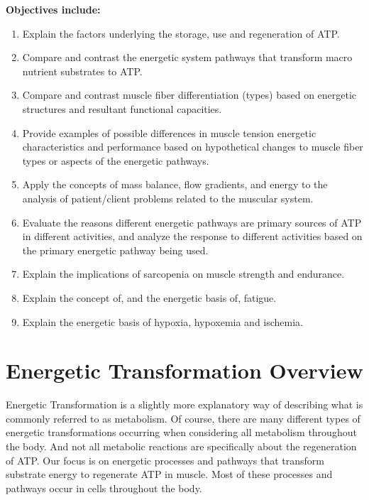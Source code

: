 \textbf{Objectives include:}
\begin{enumerate}
    \item Explain the factors underlying the storage, use and regeneration of ATP.
     \item Compare and contrast the energetic system pathways that transform macro nutrient substrates to ATP.
    \item Compare and contrast muscle fiber differentiation (types) based on energetic structures and resultant functional capacities.
    \item Provide examples of possible differences in muscle tension energetic characteristics and performance based on hypothetical changes to muscle fiber types or aspects of the energetic pathways.
    \item  Apply the concepts of mass balance, flow gradients, and energy to the analysis of patient/client problems related to the muscular system.
     \item Evaluate the reasons different energetic pathways are primary sources of ATP in different activities, and analyze the response to different activities based on the primary energetic pathway being used.
     \item Explain the implications of sarcopenia on muscle strength and endurance.
     \item Explain the concept of, and the energetic basis of, fatigue.
     \item Explain the energetic basis of hypoxia, hypoxemia and ischemia.
\end{enumerate}

\section{Energetic Transformation Overview}

Energetic Transformation is a slightly more explanatory way of describing what is commonly referred to as metabolism. Of course, there are many different types of energetic transformations occurring when considering all metabolism throughout the body. And not all metabolic reactions are specifically about the regeneration of ATP. Our focus is on energetic processes and pathways that transform substrate energy to regenerate ATP in muscle. Most of these processes and pathways occur in cells throughout the body.

